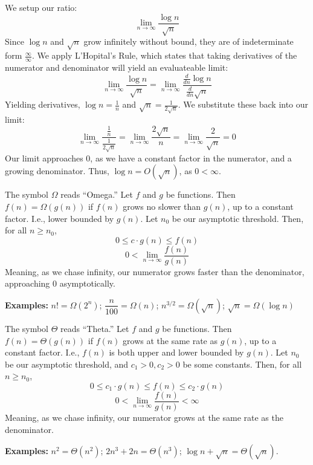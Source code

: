 \begin{Proof}[$\log n = O(\sqrt{n})$]
We setup our ratio:
\[\lim_{n\to\infty}\dfrac{\log n}{\sqrt{n}}\]
\noindent
Since $\log n$ and $\sqrt{n}$ grow infinitely without bound, they are of indeterminate form $\frac{\infty}{\infty}$. We apply L'Hopital's Rule, which states
that taking derivatives of the numerator and denominator will yield an evaluateable limit:
\Large
\[\lim_{n\to\infty}\dfrac{\log n}{\sqrt{n}}=\lim_{n\to\infty}\dfrac{\frac{d}{dn}\log n}{\frac{d}{dn}\sqrt{n}}\]
\normalsize
\noindent
Yielding derivatives, $\log n = \frac{1}{n}$ and $\sqrt{n}=\frac{1}{2\sqrt{n}}$. We substitute these back into our limit:
\Large
\[\lim_{n\to\infty}\dfrac{\frac{1}{n}}{\frac{1}{2\sqrt{n}}}=\lim_{n\to\infty}\dfrac{2\sqrt{n}}{n}=\lim_{n\to\infty}\dfrac{2}{\sqrt{n}}=0\]
\normalsize
\noindent
Our limit approaches 0, as we have a constant factor in the numerator, and a growing denominator. Thus, $\log n = O(\sqrt{n})$, as $0<\infty$.
\end{Proof}

\begin{Def}

    The symbol $\Omega$ reads ``Omega.'' Let $f$ and $g$ be functions. Then 
    $f(n)=\Omega(g(n))$ if $f(n)$ grows no slower than $g(n)$, up to a constant factor. I.e.,
    lower bounded by $g(n)$. Let $n_0$ be our asymptotic threshold. Then, for all $n\geq n_0$,
    \large
    \[0\leq c\cdot g(n) \leq f(n)\]
    \[0<\lim_{n\to\infty}\dfrac{f(n)}{g(n)}\]
    \normalsize
    \noindent
    Meaning, as we chase infinity, our numerator grows faster than the denominator, approaching 0 asymptotically.
\end{Def}

\noindent
\textbf{Examples:} $n!=\Omega(2^n)$; $\dfrac{n}{100}= \Omega(n)$; $n^{3/2}= \Omega(\sqrt{n})$; $\sqrt{n} = \Omega(\log n)$

\newpage

\begin{Def}

    The symbol $\Theta$ reads ``Theta.'' Let $f$ and $g$ be functions. Then $f(n)=\Theta(g(n))$ if $f(n)$ grows at the same rate as $g(n)$, up to a constant factor. I.e., $f(n)$ is both upper and lower bounded by $g(n)$. Let $n_0$ be our asymptotic threshold, and $c_1>0,c_2>0$ be some constants. Then, for all $n\geq n_0$,
    \large
    \[0\leq c_1\cdot g(n) \leq f(n) \leq c_2\cdot g(n)\]
    \[0<\lim_{n\to\infty}\dfrac{f(n)}{g(n)}<\infty\]
    \normalsize
    \noindent
    Meaning, as we chase infinity, our numerator grows at the same rate as the denominator.
\end{Def}
\textbf{Examples:} $n^2=\Theta(n^2)$; $2n^3+2n=\Theta(n^3)$; $\log n+\sqrt{n}=\Theta(\sqrt{n})$.

